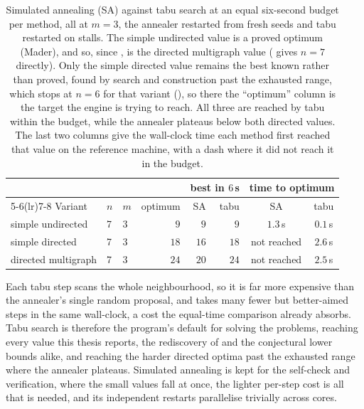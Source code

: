 \begin{table}[ht]
    \centering
    \begin{tabular}{lllrrrcc}
        \toprule
         & & & & \multicolumn{2}{c}{best in $6$\,s} & \multicolumn{2}{c}{time to optimum} \\
        \cmidrule(lr){5-6}\cmidrule(lr){7-8}
        Variant & $n$ & $m$ & optimum & SA & tabu & SA & tabu \\
        \midrule
        simple undirected   & 7 & 3 & $9$  & $9$  & $9$  & $1.3$\,s & $0.1$\,s \\
        simple directed     & 7 & 3 & $18$ & $16$ & $18$ & not reached & $2.6$\,s \\
        directed multigraph & 7 & 3 & $24$ & $20$ & $24$ & not reached & $2.5$\,s \\
        \bottomrule
    \end{tabular}
    \caption{Simulated annealing (SA) against tabu search at an equal six-second budget per method, all at $m = 3$, the annealer restarted from fresh seeds and tabu restarted on stalls. The simple undirected value is a proved optimum (Mader), and so, since , is the directed multigraph value ( gives $n = 7$ directly). Only the simple directed value remains the best known rather than proved, found by search and construction past the exhausted range, which stops at $n = 6$ for that variant (), so there the ``optimum'' column is the target the engine is trying to reach. All three are reached by tabu within the budget, while the annealer plateaus below both directed values. The last two columns give the wall-clock time each method first reached that value on the reference machine, with a dash where it did not reach it in the budget.}
    \label{tab:sa-vs-tabu}
\end{table}

Each tabu step scans the whole neighbourhood, so it is far more expensive than the annealer's single random proposal, and takes many fewer but better-aimed steps in the same wall-clock, a cost the equal-time comparison already absorbs. Tabu search is therefore the program's default for solving the problems, reaching every value this thesis reports, the rediscovery of  and the conjectural lower bounds alike, and reaching the harder directed optima past the exhausted range where the annealer plateaus. Simulated annealing is kept for the self-check and verification, where the small values fall at once, the lighter per-step cost is all that is needed, and its independent restarts parallelise trivially across cores.

